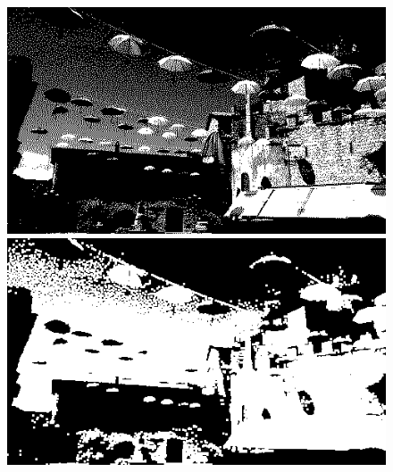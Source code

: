\documentclass{article}
\begin{document}
	\begin{figure}[!ht]	
	\centering	
	\includegraphics[scale=1.2]{img/mono-obraz1}
	\includegraphics[scale=0.288]{img/morfologiczne/dylatacja-mono}
	

\end{figure}
\end{document}
